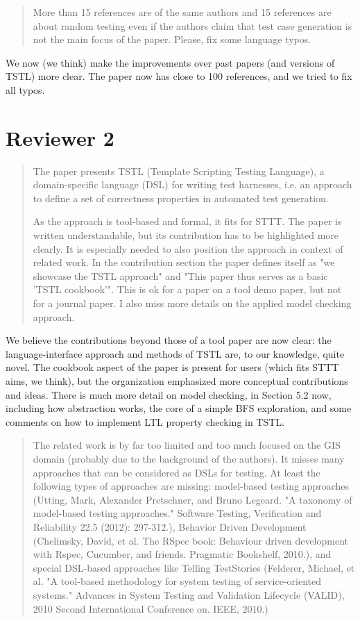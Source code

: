 \documentclass{article}[12pt]
\begin{document}
\begin{quote}
More than 15 references are of the same authors and 15 references are about random 
testing even if the authors claim that test case generation is not the main focus of 
the paper.
Please, fix some language typos.
\end{quote}

We now (we think) make the improvements over past papers (and versions of TSTL) more clear.  The paper now has close to 100 references, and we tried to fix all typos.



\section{Reviewer 2}

\begin{quote}
The paper presents TSTL (Template Scripting Testing Language), a domain-specific 
language (DSL) for writing test harnesses, i.e. an approach to define a set of 
correctness properties in automated test generation.

As the approach is tool-based and formal, it fits for STTT. The paper is written
understandable, but its contribution has to be highlighted more clearly. 
It is especially needed to also position the approach in context of related work. In 
the contribution section the paper defines itself as "we showcase the TSTL approach" 
and "This paper thus serves as a basic 'TSTL cookbook'". This is ok for a paper on a 
tool demo paper, but not for a journal paper. I also miss more details on the 
applied model checking approach.
\end{quote}

We believe the contributions beyond those of a tool paper are now clear:  the language-interface approach and methods of TSTL are, to our knowledge, quite novel.  The cookbook aspect of the paper is present for users (which fits STTT aims, we think), but the organization emphasized more conceptual contributions and ideas.  There is much more detail on model checking, in Section 5.2 now, including how abstraction works, the core of a simple BFS exploration, and some comments on how to implement LTL property checking in TSTL.

\begin{quote}
The related work is by far too limited and too much focused on the GIS domain 
(probably due to the background of the authors). It misses many approaches that can 
be considered as DSLs for testing. At least the following types of approaches are 
missing: model-based testing approaches (Utting, Mark, Alexander Pretschner, and 
Bruno Legeard. "A taxonomy of model-based testing approaches." Software Testing, 
Verification and Reliability 22.5 (2012): 297-312.), Behavior Driven Development 
(Chelimsky, David, et al. The RSpec book: Behaviour driven development with Rspec, 
Cucumber, and friends. Pragmatic Bookshelf, 2010.), and special DSL-based approaches 
like Telling TestStories (Felderer, Michael, et al. "A tool-based methodology for 
system testing of service-oriented systems." Advances in System Testing and 
Validation Lifecycle (VALID), 2010 Second International Conference on. IEEE, 2010.)
\end{quote}
\end{document}
